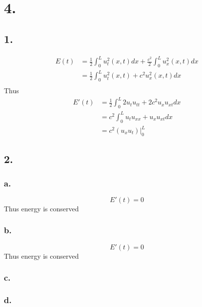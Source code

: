 \documentclass[11pt]{article}
\theoremstyle{mystyle}
\theoremstyle{definition}
\begin{document}
\section*{4.}
\subsection*{1.}
\begin{align*}
  E(t) &= \displaystyle\frac{1}{2} \int_0^L u_t^2(x,t)dx + \displaystyle\frac{c^2}{2} \int_0^L u_x^2(x,t) dx \\
  &= \displaystyle\frac{1}{2} \int_0^L u_t^2(x,t) + c^2 u_x^2(x,t)dx \\
\end{align*}
Thus 
\begin{align*} 
  E'(t) &= \displaystyle\frac{1}{2} \int_0^L 2u_t u_{tt} + 2c^2 u_x u_{xt} dx \\
  &= c^2 \int_0^L u_t u_{xx} + u_x u_{xt} dx \\
  &= c^2 \left. \left( u_x u_t \right)\right|_0^L
\end{align*}
\subsection*{2.}
\subsubsection*{a.}
\[
  E'(t) = 0
\]
Thus energy is conserved
\subsubsection*{b.}
\[
  E'(t) = 0
\]
Thus energy is conserved
\subsubsection*{c.}

\subsubsection*{d.}
\end{document}
